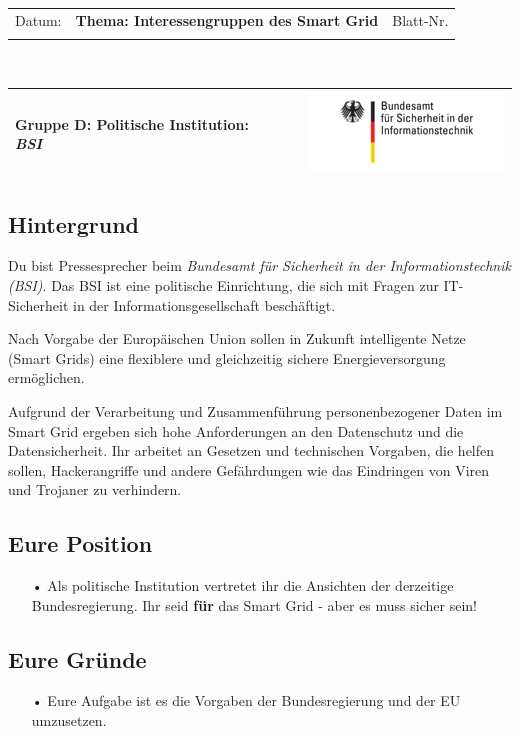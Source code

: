 \documentclass[11pt,a4paper,DIV=10,parskip=half,BCOR=0mm]{scrartcl}
\begin{document}
%
\setlength{\tabcolsep}{3mm} %
\noindent
\begin{tabularx}{\textwidth}{|l|T|l|}
\hline
Datum: & \rule{0pt}{5mm} \textbf{\textsf{Thema: Interessengruppen des Smart Grid}} & Blatt-Nr. \\
&&\\ 
\hline
\end{tabularx}
\rule{0pt}{3mm} \\
\setlength{\tabcolsep}{0mm} %
\begin{tabularx}{\linewidth}{lXr}
{\Large\textsf{\textbf{Gruppe D:} Politische Institution: \textit{BSI}}} & & \includegraphics[scale=0.6]{images/bsi}\\
\hline
\end{tabularx}
%
\subsection*{Hintergrund}
Du bist Pressesprecher beim\textit{ Bundesamt für Sicherheit in der Informationstechnik (BSI)}. Das BSI ist eine politische Einrichtung, die sich mit Fragen zur IT-Sicherheit in der Informationsgesellschaft beschäftigt. 

Nach Vorgabe der Europäischen Union sollen in Zukunft intelligente Netze (Smart Grids) eine flexiblere und gleichzeitig sichere Energieversorgung ermöglichen.

Aufgrund der Verarbeitung und Zusammenführung  personenbezogener Daten  im Smart Grid ergeben sich hohe Anforderungen an den Datenschutz und die Datensicherheit. Ihr arbeitet an Gesetzen und technischen Vorgaben, die helfen sollen, Hackerangriffe und andere Gefährdungen wie das Eindringen von Viren und Trojaner zu verhindern.
\subsection*{Eure Position}
\begin{enumerate}
	\item[•]Als politische Institution vertretet ihr die Ansichten der derzeitige Bundesregierung. Ihr seid \textbf{für} das Smart Grid - aber es muss sicher sein!
\end{enumerate}
\subsection*{Eure Gründe}
\begin{enumerate}
	\item[•] Eure Aufgabe ist es die Vorgaben der Bundesregierung und der EU umzusetzen.

\end{enumerate}
\end{document}
